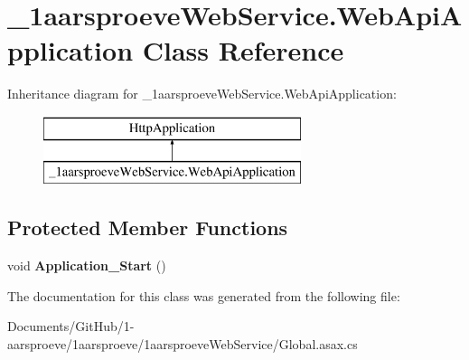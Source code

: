 \hypertarget{class__1aarsproeve_web_service_1_1_web_api_application}{}\section{\+\_\+1aarsproeve\+Web\+Service.\+Web\+Api\+Application Class Reference}
\label{class__1aarsproeve_web_service_1_1_web_api_application}
Inheritance diagram for \+\_\+1aarsproeve\+Web\+Service.\+Web\+Api\+Application\+:\begin{figure}[H]
\begin{center}
\leavevmode
\includegraphics[height=2.000000cm]{class__1aarsproeve_web_service_1_1_web_api_application}
\end{center}
\end{figure}
\subsection*{Protected Member Functions}
\begin{DoxyCompactItemize}
\item 
\hypertarget{class__1aarsproeve_web_service_1_1_web_api_application_a4df9555d507ebda395e42ae2f0b20acf}{}void {\bfseries Application\+\_\+\+Start} ()\label{class__1aarsproeve_web_service_1_1_web_api_application_a4df9555d507ebda395e42ae2f0b20acf}

\end{DoxyCompactItemize}


The documentation for this class was generated from the following file\+:\begin{DoxyCompactItemize}
\item 
Documents/\+Git\+Hub/1-\/aarsproeve/1aarsproeve/1aarsproeve\+Web\+Service/Global.\+asax.\+cs\end{DoxyCompactItemize}
